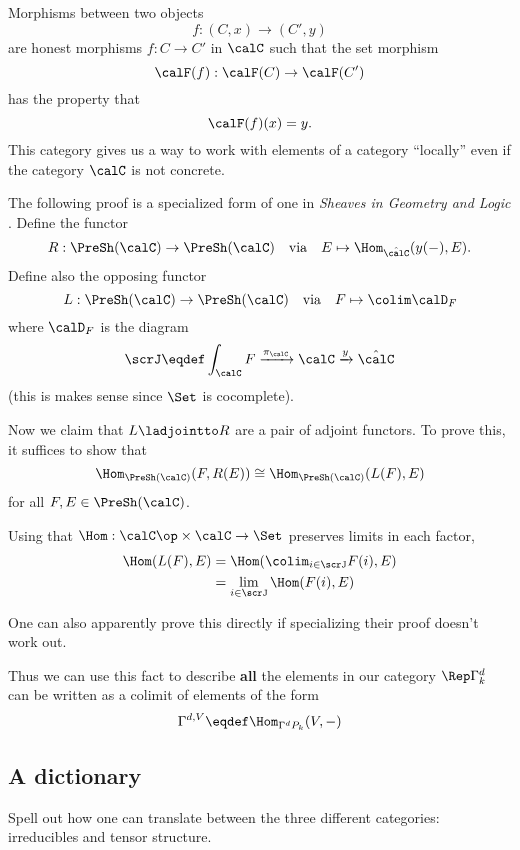 \documentclass[12pt]{article}
\begin{document}
Morphisms between two objects
\[f:(C,x)\to (C',y)\]
are honest morphisms $f:C\to C'$ in $\calC$ such that the set morphism
\[\calF(f):\calF(C)\to \calF(C')\]
has the property that 
\[\calF(f)(x)=y.\]
This category gives us a way to work with elements of a category ``locally'' even if the category $\calC$ 
is not concrete.

\begin{prf}
	The following proof is a specialized form of one in \textit{Sheaves in Geometry and Logic} \cite[41-43]{maclane-moerdijk}. 
	Define the functor
	\[R:\PreSh(\calC)\to \PreSh(\calC)\quad\text{via}\quad E\mapsto \Hom_{\hat\calC}(y(-),E).\]
	Define also the opposing functor 
	\[L:\PreSh(\calC)\to \PreSh(\calC)\quad\text{via}\quad F\mapsto \colim \calD_F\]
	where $\calD_F$ is the diagram  
	\[\scrJ\eqdef\int_\calC F\xrightarrow{\pi_\calC}\calC\xrightarrow{y}\hat\calC\]
	(this is makes sense since $\Set$ is cocomplete).

	Now we claim that $L\ladjointto R$ are a pair of adjoint functors. To prove this, it suffices to show that
	\[\Hom_{\PreSh(\calC)}(F,R(E))\cong \Hom_{\PreSh(\calC)}(L(F),E)\]
	for all $F,E\in\PreSh(\calC)$.

	Using that $\Hom:\calC\op\times\calC\to \Set$ preserves limits in each factor,
	\begin{align*}
		\Hom(L(F),E)&=\Hom(\colim_{i\in\scrJ}F(i),E)\\
		&=\lim_{i\in\scrJ}\Hom(F(i),E)
	\end{align*}

	{\color{red} One can also apparently prove this directly if specializing their proof doesn't work out.}
\end{prf}

Thus we can use this fact to describe \textbf{all} the elements in our category $\Rep \Gamma^d_k$ can be written as a colimit of 
elements of the form 
\[\Gamma^{d,V}\eqdef\Hom_{\Gamma^dP_k}(V,-)\]


\subsection{A dictionary}
{\color{red} Spell out how one can translate between the three different categories: irreducibles and tensor structure.}

\newpage
\end{document}
